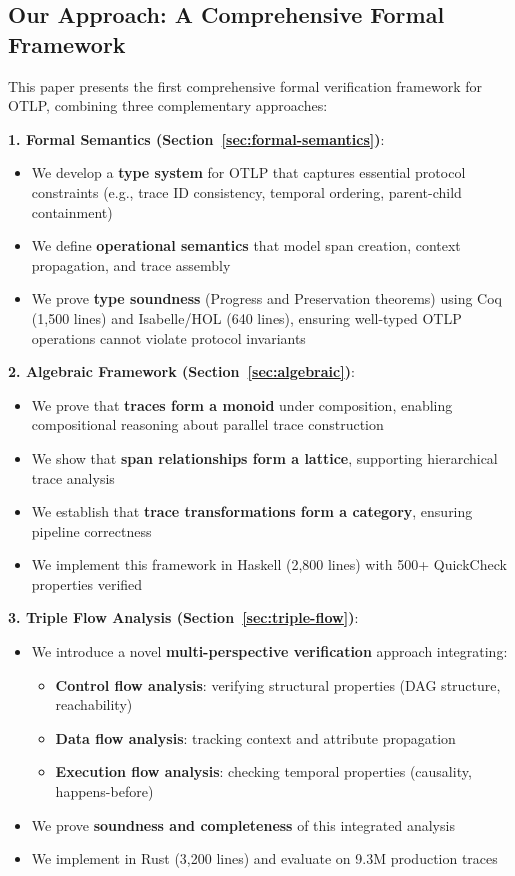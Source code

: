 \subsection{Our Approach: A Comprehensive Formal Framework}
\label{sec:our-approach}

This paper presents the first comprehensive formal verification framework for OTLP, combining three complementary approaches:

\textbf{1. Formal Semantics (Section~\ref{sec:formal-semantics})}:
\begin{itemize}
\item We develop a \textbf{type system} for OTLP that captures essential protocol constraints (e.g., trace ID consistency, temporal ordering, parent-child containment)
\item We define \textbf{operational semantics} that model span creation, context propagation, and trace assembly
\item We prove \textbf{type soundness} (Progress and Preservation theorems) using Coq (1,500 lines) and Isabelle/HOL (640 lines), ensuring well-typed OTLP operations cannot violate protocol invariants
\end{itemize}

\textbf{2. Algebraic Framework (Section~\ref{sec:algebraic})}:
\begin{itemize}
\item We prove that \textbf{traces form a monoid} under composition, enabling compositional reasoning about parallel trace construction
\item We show that \textbf{span relationships form a lattice}, supporting hierarchical trace analysis
\item We establish that \textbf{trace transformations form a category}, ensuring pipeline correctness
\item We implement this framework in Haskell (2,800 lines) with 500+ QuickCheck properties verified
\end{itemize}

\textbf{3. Triple Flow Analysis (Section~\ref{sec:triple-flow})}:
\begin{itemize}
\item We introduce a novel \textbf{multi-perspective verification} approach integrating:
  \begin{itemize}
  \item \textbf{Control flow analysis}: verifying structural properties (DAG structure, reachability)
  \item \textbf{Data flow analysis}: tracking context and attribute propagation
  \item \textbf{Execution flow analysis}: checking temporal properties (causality, happens-before)
  \end{itemize}
\item We prove \textbf{soundness and completeness} of this integrated analysis
\item We implement in Rust (3,200 lines) and evaluate on 9.3M production traces
\end{itemize}

